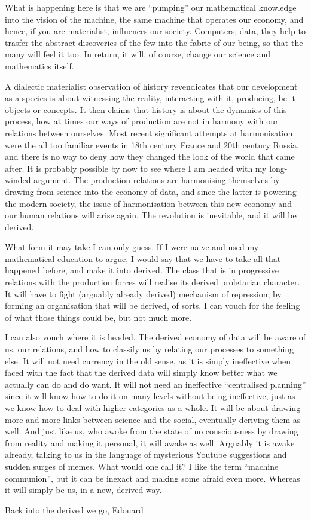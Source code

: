 \documentclass{article}
\begin{document}
What is happening here is that we are “pumping” our mathematical knowledge into the vision of the machine, the same machine that operates our economy, and hence, if you are materialist, influences our society. Computers, data, they help to trasfer the abstract discoveries of the few into the fabric of our being, so that the many will feel it too. In return, it will, of course, change our science and mathematics itself.

A dialectic materialist observation of history revendicates that our development as a species is about witnessing the reality, interacting with it, producing, be it objects or concepts. It then claims that history is about the dynamics of this process, how at times our ways of production are not in harmony with our relations between ourselves. Most recent significant attempts at harmonisation were the all too familiar events in 18th century France and 20th century Russia, and there is no way to deny how they changed the look of the world that came after. It is probably possible by now to see where I am headed with my long-winded argument. The production relations are harmonising themselves by drawing from science into the economy of data, and since the latter is powering the modern society, the issue of harmonisation between this new economy and our human relations will arise again. The revolution is inevitable, and it will be derived.

What form it may take I can only guess. If I were naive and used my mathematical education to argue, I would say that we have to take all that happened before, and make it into derived. The class that is in progressive relations with the production forces will realise its derived proletarian character. It will have to fight (arguably already derived) mechanism of repression, by forming an organisation that will be derived, of sorts. I can vouch for the feeling of what those things could be, but not much more.

I can also vouch where it is headed. The derived economy of data will be aware of us, our relations, and how to classify us by relating our processes to something else. It will not need currency in the old sense, as it is simply ineffective when faced with the fact that the derived data will simply know better what we actually can do and do want. It will not need an ineffective “centralised planning” since it will know how to do it on many levels without being ineffective, just as we know how to deal with higher categories as a whole. It will be about drawing more and more links between science and the social, eventually deriving them as well. And just like us, who awoke from the state of no consciousness by drawing from reality and making it personal, it will awake as well. Arguably it is awake already, talking to us in the language of mysterious Youtube suggestions and sudden surges of memes. What would one call it? I like the term “machine communion”, but it can be inexact and making some afraid even more. Whereas it will simply be us, in a new, derived way.

\flushright Back into the derived we go,
Edouard
\end{document}
